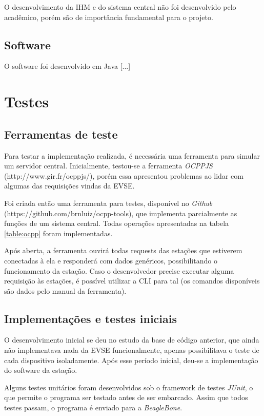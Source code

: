 O desenvolvimento da IHM e do sistema central não foi desenvolvido pelo acadêmico, porém são de importância fundamental para o projeto.

\subsection{Software}

O software foi desenvolvido em Java [...]

\section{Testes}

\subsection{Ferramentas de teste}

Para testar a implementação realizada, é necessária uma ferramenta para simular um servidor central. Inicialmente, testou-se a ferramenta \textit{OCPPJS} (http://www.gir.fr/ocppjs/), porém essa apresentou problemas ao lidar com algumas das requisições vindas da \ac{EVSE}.

Foi criada então uma ferramenta para testes, disponível no \textit{Github} (https://github.com/brnluiz/ocpp-tools), que implementa parcialmente as funções de um sistema central. Todas operações apresentadas na tabela \ref{table:ocpp} foram implementadas.

Após aberta, a ferramenta ouvirá todas requests das estações que estiverem conectadas à ela e responderá com dados genéricos, possibilitando o funcionamento da estação. Caso o desenvolvedor precise executar alguma requisição às estações, é possível utilizar a \ac{CLI} para tal (os comandos disponíveis são dados pelo manual da ferramenta).

\subsection{Implementações e testes iniciais}

O desenvolvimento inicial se deu no estudo da base de código anterior, que ainda não implementava nada da \ac{EVSE} funcionalmente, apenas possibilitava o teste de cada dispositivo isoladamente. Após esse período inicial, deu-se a implementação do software da estação.

Alguns testes unitários foram desenvolvidos sob o framework de testes \textit{JUnit}, o que permite o programa ser testado antes de ser embarcado. Assim que todos testes passam, o programa é enviado para a \textit{BeagleBone}.

